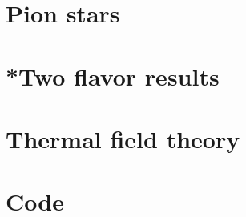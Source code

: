 \documentclass{book}
\begin{document}
    \chapter{Pion stars}
    \label{chapter: pion stars}
    

    \appendix

    \chapter[Appendix A]{}
    
    
    
    

    \chapter{*Two flavor results}
    
    
    
    
    \chapter{Thermal field theory}
    \label{appendix: thermal field theory}
    
    
    
    
    
    
    
    \chapter{Code}
    

    \cleardoublepage
    \printbibliography
\end{document}
